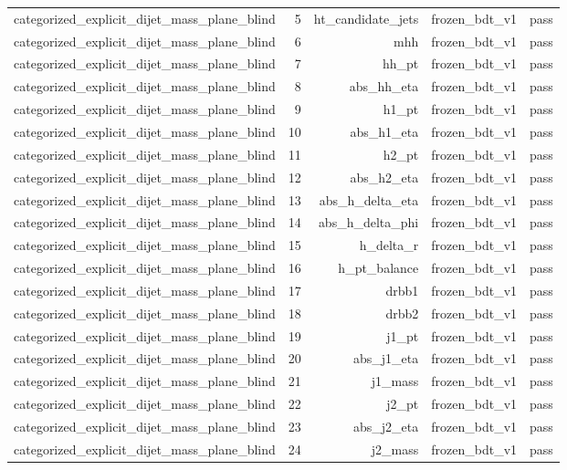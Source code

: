 \begin{table}[htbp]
\begin{tabular}{lrrrr}
categorized\_explicit\_dijet\_mass\_plane\_blind & 5 & ht\_candidate\_jets & frozen\_bdt\_v1 & pass \\
categorized\_explicit\_dijet\_mass\_plane\_blind & 6 & mhh & frozen\_bdt\_v1 & pass \\
categorized\_explicit\_dijet\_mass\_plane\_blind & 7 & hh\_pt & frozen\_bdt\_v1 & pass \\
categorized\_explicit\_dijet\_mass\_plane\_blind & 8 & abs\_hh\_eta & frozen\_bdt\_v1 & pass \\
categorized\_explicit\_dijet\_mass\_plane\_blind & 9 & h1\_pt & frozen\_bdt\_v1 & pass \\
categorized\_explicit\_dijet\_mass\_plane\_blind & 10 & abs\_h1\_eta & frozen\_bdt\_v1 & pass \\
categorized\_explicit\_dijet\_mass\_plane\_blind & 11 & h2\_pt & frozen\_bdt\_v1 & pass \\
categorized\_explicit\_dijet\_mass\_plane\_blind & 12 & abs\_h2\_eta & frozen\_bdt\_v1 & pass \\
categorized\_explicit\_dijet\_mass\_plane\_blind & 13 & abs\_h\_delta\_eta & frozen\_bdt\_v1 & pass \\
categorized\_explicit\_dijet\_mass\_plane\_blind & 14 & abs\_h\_delta\_phi & frozen\_bdt\_v1 & pass \\
categorized\_explicit\_dijet\_mass\_plane\_blind & 15 & h\_delta\_r & frozen\_bdt\_v1 & pass \\
categorized\_explicit\_dijet\_mass\_plane\_blind & 16 & h\_pt\_balance & frozen\_bdt\_v1 & pass \\
categorized\_explicit\_dijet\_mass\_plane\_blind & 17 & drbb1 & frozen\_bdt\_v1 & pass \\
categorized\_explicit\_dijet\_mass\_plane\_blind & 18 & drbb2 & frozen\_bdt\_v1 & pass \\
categorized\_explicit\_dijet\_mass\_plane\_blind & 19 & j1\_pt & frozen\_bdt\_v1 & pass \\
categorized\_explicit\_dijet\_mass\_plane\_blind & 20 & abs\_j1\_eta & frozen\_bdt\_v1 & pass \\
categorized\_explicit\_dijet\_mass\_plane\_blind & 21 & j1\_mass & frozen\_bdt\_v1 & pass \\
categorized\_explicit\_dijet\_mass\_plane\_blind & 22 & j2\_pt & frozen\_bdt\_v1 & pass \\
categorized\_explicit\_dijet\_mass\_plane\_blind & 23 & abs\_j2\_eta & frozen\_bdt\_v1 & pass \\
categorized\_explicit\_dijet\_mass\_plane\_blind & 24 & j2\_mass & frozen\_bdt\_v1 & pass \\

\end{tabular}
\end{table}
